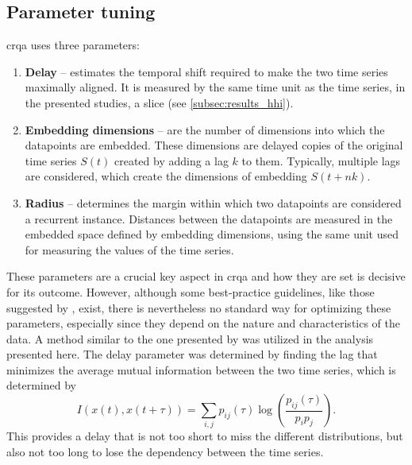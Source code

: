 \subsection{Parameter tuning}
\label{subsec:parameters_crqa}

\Ac{crqa} uses three parameters:

\begin{enumerate}
	\item \textbf{Delay} -- estimates the temporal shift required to make the two time series maximally aligned.
	It is measured by the same time unit as the time series, in the presented studies, a slice (see \cref{subsec:results_hhi}).
	
	\item \textbf{Embedding dimensions} -- are the number of dimensions into which the datapoints are embedded.
	These dimensions are delayed copies of the original time series $S(t)$ created by adding a lag $k$ to them.
	Typically, multiple lags are considered, which create the dimensions of embedding $S(t + nk)$.
	
	\item \textbf{Radius} -- determines the margin within which two datapoints are considered a recurrent instance.
	Distances between the datapoints are measured in the embedded space defined by embedding dimensions, using the same unit used for measuring the values of the time series.
\end{enumerate}
%
These parameters are a crucial key aspect in \ac{crqa} and how they are set is decisive for its outcome.
However, although some best-practice guidelines, like those suggested by \citet{Coco2014crqa-r}, exist, there is nevertheless no standard way for optimizing these parameters, especially since they depend on the nature and characteristics of the data.
A method similar to the one presented by \citet{Marwan2007recurrence} was utilized in the analysis presented here.
The delay parameter was determined by finding the lag that minimizes the average mutual information between the two time series, which is determined by
%
\begin{equation}
	\label{eq:average_mutual_information}
	I\left( x(t), x(t + \tau) \right) = \sum_{i,j} p_{ij} (\tau) \log \left( \frac{p_{ij} \left( \tau \right)}{p_i p_j} \right).
\end{equation}
%
This provides a delay that is not too short to miss the different distributions, but also not too long to lose the dependency between the time series.
